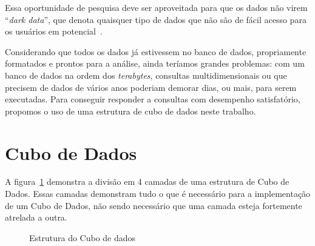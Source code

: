 Essa oportunidade de pesquisa deve ser aproveitada para que os dados não virem ``\textit{dark data}'', que denota quaisquer tipo de dados que não são de fácil acesso para os usuários em potencial~\cite{heidornSheddingLightDark2008}.

Considerando que todos os dados já estivessem no banco de dados, propriamente formatados e prontos para a análise, ainda teríamos grandes problemas: com um banco de dados na ordem dos \textit{terabytes}, consultas multidimensionais ou que precisem de dados de vários anos poderiam demorar dias, ou mais, para serem executadas.
Para conseguir responder a consultas com desempenho satisfatório, propomos o uso de uma estrutura de cubo de dados neste trabalho.

\section{Cubo de Dados}\label{ch:prop:cubearch}

A figura~\ref{fig:cubearch} demonstra a divisão em 4 camadas de uma estrutura de Cubo de Dados.
Essas camadas demonstram tudo o que é necessário para a implementação de um Cubo de Dados, não sendo necessário que uma camada esteja fortemente atrelada a outra.

\begin{figure}[ht]
	\caption{Estrutura do Cubo de dados}\label{fig:cubearch}
	\vspace{6mm}
	\begin{center}
	\end{center}
	\vspace{2mm}
	\legenda{}
\end{figure}

